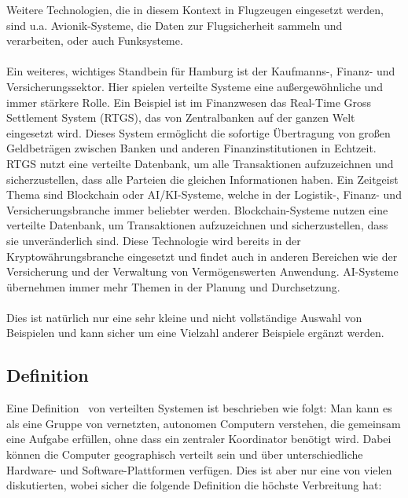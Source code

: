 \documentclass[../vs-script-first-v01.tex]{subfiles}
\begin{document}
Weitere Technologien, die in diesem Kontext in Flugzeugen eingesetzt werden, sind u.a. Avionik-Systeme, die Daten zur Flugsicherheit sammeln und verarbeiten, oder auch Funksysteme.
\\\\
Ein weiteres, wichtiges Standbein für Hamburg ist der Kaufmanns-, Finanz- und Versicherungssektor. Hier spielen verteilte Systeme eine außergewöhnliche und immer stärkere Rolle. Ein Beispiel ist im Finanzwesen das Real-Time Gross Settlement System (RTGS)\cite{rtgs}, das von Zentralbanken auf der ganzen Welt eingesetzt wird. Dieses System ermöglicht die sofortige Übertragung von großen Geldbeträgen zwischen Banken und anderen Finanzinstitutionen in Echtzeit. RTGS nutzt eine verteilte Datenbank, um alle Transaktionen aufzuzeichnen und sicherzustellen, dass alle Parteien die gleichen Informationen haben.
Ein Zeitgeist Thema sind Blockchain\cite{blockchain} oder AI/KI-Systeme, welche in der Logistik-, Finanz- und Versicherungsbranche immer beliebter werden. Blockchain-Systeme nutzen eine verteilte Datenbank, um Transaktionen aufzuzeichnen und sicherzustellen, dass sie unveränderlich sind. Diese Technologie wird bereits in der Kryptowährungsbranche eingesetzt und findet auch in anderen Bereichen wie der Versicherung und der Verwaltung von Vermögenswerten Anwendung. AI-Systeme übernehmen immer mehr Themen in der Planung und Durchsetzung.
\\\\
Dies ist natürlich nur eine sehr kleine und nicht vollständige Auswahl von Beispielen und kann sicher um eine Vielzahl anderer Beispiele ergänzt werden. 


\newpage
\subsection{Definition}

Eine Definition~\cite{coulouris2012distributed} von verteilten Systemen ist beschrieben wie folgt: Man kann es als eine Gruppe von vernetzten, autonomen Computern verstehen, die gemeinsam eine Aufgabe erfüllen, ohne dass ein zentraler Koordinator benötigt wird. Dabei können die Computer geographisch verteilt sein und über unterschiedliche Hardware- und Software-Plattformen verfügen. Dies ist aber nur eine von vielen diskutierten, wobei sicher die folgende Definition die höchste Verbreitung hat: 
\end{document}
